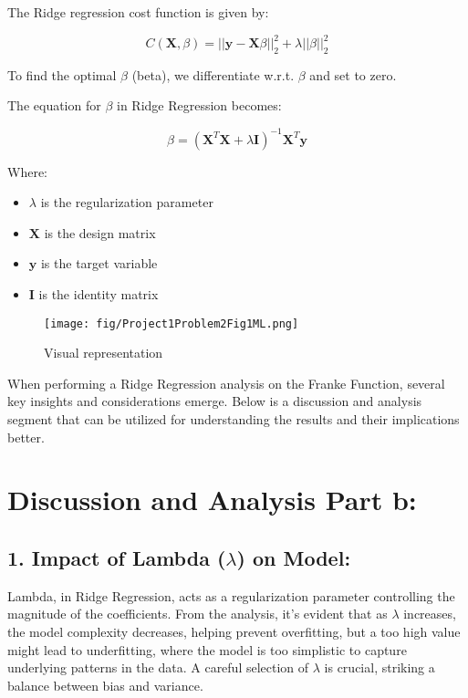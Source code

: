 \documentclass{article}
\begin{document}
The Ridge regression cost function is given by:

\[
C(\mathbf{X}, \beta) = ||\mathbf{y} - \mathbf{X}\beta||^2_2 + \lambda||\beta||^2_2
\]

To find the optimal \( \beta \) (beta), we differentiate w.r.t. \( \beta \) and set to zero.

The equation for \( \beta \) in Ridge Regression becomes:

\[
\beta = (\mathbf{X}^T \mathbf{X} + \lambda \mathbf{I})^{-1} \mathbf{X}^T \mathbf{y}
\]

Where:

\begin{itemize}
    \item \( \lambda \) is the regularization parameter
    \item \( \mathbf{X} \) is the design matrix
    \item \( \mathbf{y} \) is the target variable
    \item \( \mathbf{I} \) is the identity matrix
\end{itemize}

 \begin{figure}[htbp]
    \centering
    \texttt{[image: fig/Project1Problem2Fig1ML.png]}
    \caption{Visual representation}
    \label{fig:python-code}
\end{figure}

When performing a Ridge Regression analysis on the Franke Function, several key insights and considerations emerge. Below is a discussion and analysis segment that can be utilized for understanding the results and their implications better.

\section*{Discussion and Analysis Part b:}

\subsection*{1. Impact of Lambda ($\lambda$) on Model:}
Lambda, in Ridge Regression, acts as a regularization parameter controlling the magnitude of the coefficients. From the analysis, it's evident that as $\lambda$ increases, the model complexity decreases, helping prevent overfitting, but a too high value might lead to underfitting, where the model is too simplistic to capture underlying patterns in the data. A careful selection of $\lambda$ is crucial, striking a balance between bias and variance.
\end{document}
